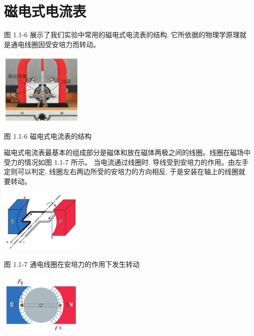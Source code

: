 \documentclass[10pt]{article}
\begin{document}
\section*{磁电式电流表}

图 1.1-6 展示了我们实验中常用的磁电式电流表的结构, 它所依据的物理学原理就是通电线圈因受安培力而转动。

\begin{center}
\includegraphics[max width=0.3\textwidth]{images/01910e72-c5b7-7ed5-a6d4-fb3a5faefc32_10_165838.jpg}
\end{center}

图 1.1-6 磁电式电流表的结构

磁电式电流表最基本的组成部分是磁体和放在磁体两极之间的线圈。线圈在磁场中受力的情况如图 1.1-7 所示。 当电流通过线圈时, 导线受到安培力的作用。由左手定则可以判定, 线圈左右两边所受的安培力的方向相反, 于是安装在轴上的线圈就要转动。

\begin{center}
\includegraphics[max width=0.3\textwidth]{images/01910e72-c5b7-7ed5-a6d4-fb3a5faefc32_10_202706.jpg}
\end{center}

图 1.1-7 通电线圈在安培力的作用下发生转动

\begin{center}
\includegraphics[max width=0.3\textwidth]{images/01910e72-c5b7-7ed5-a6d4-fb3a5faefc32_10_553810.jpg}
\end{center}
\end{document}
